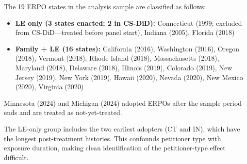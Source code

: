 \documentclass[12pt]{article}
\begin{document}
The 19 ERPO states in the analysis sample are classified as follows:
\begin{itemize}
\item \textbf{LE only (3 states enacted; 2 in CS-DiD):} Connecticut (1999; excluded from CS-DiD---treated before panel start), Indiana (2005), Florida (2018)
\item \textbf{Family + LE (16 states):} California (2016), Washington (2016), Oregon (2018), Vermont (2018), Rhode Island (2018), Massachusetts (2018), Maryland (2018), Delaware (2018), Illinois (2019), Colorado (2019), New Jersey (2019), New York (2019), Hawaii (2020), Nevada (2020), New Mexico (2020), Virginia (2020)
\end{itemize}
Minnesota (2024) and Michigan (2024) adopted ERPOs after the sample period ends and are treated as not-yet-treated.

The LE-only group includes the two earliest adopters (CT and IN), which have the longest post-treatment histories. This confounds petitioner type with exposure duration, making clean identification of the petitioner-type effect difficult.
\end{document}

